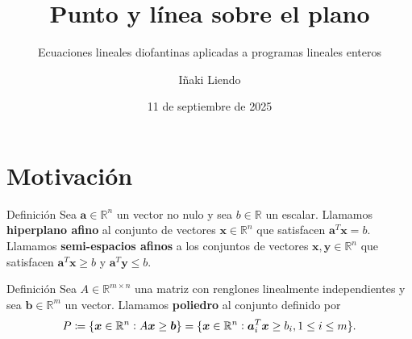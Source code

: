 \documentclass[aspectratio=169,professionalfonts]{beamer}
\title[Punto y línea sobre el plano]{Punto y línea sobre el plano}
\subtitle{Ecuaciones lineales diofantinas aplicadas a programas lineales enteros}
\author[Iñaki Liendo]{Iñaki Liendo}
\institute[ITAM]{Coloquio de matemáticas}
\date{11 de septiembre de 2025}
\newcommand{\R}{\mathbb{R}}
\renewcommand{\vec}[1]{\boldsymbol{#1}}
\newcommand{\braces}[1]{\lbrace #1 \rbrace}
\begin{document}
\begin{frame}[plain]
	\titlepage
\end{frame}

\section{Motivación}
\begin{frame}
	\begin{block}{Definición}
		Sea $\vec{a} \in \R^n$ un vector no nulo y sea $b \in \R$ un escalar. Llamamos
		\textbf{hiperplano afino} al conjunto de vectores $\vec{x} \in \R^n$ que satisfacen
		$\vec{a}^T\vec{x} = b$. Llamamos \textbf{semi-espacios afinos} a los conjuntos de vectores
		$\vec{x}, \vec{y} \in \R^n$ que satisfacen $\vec{a}^T\vec{x} \geq b$ y $\vec{a}^T\vec{y}
		\leq b$.
	\end{block}
\end{frame}

\begin{frame}
	\begin{block}{Definición}
		Sea $A \in \R^{m \times n}$ una matriz con renglones linealmente independientes y sea
		$\vec{b} \in \R^m$ un vector. Llamamos \textbf{poliedro} al conjunto definido por
		\begin{equation*}
			P \coloneq \braces{\vec{x} \in \R^n \vcentcolon A\vec{x} \geq \vec{b}}
			= \braces{\vec{x} \in \R^n \vcentcolon \vec{a}^T_i\vec{x} \geq b_i, 1 \leq i \leq m}.
		\end{equation*}
	\end{block}
\end{frame}
\end{document}

